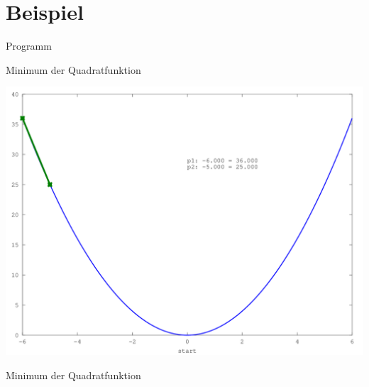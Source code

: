 \documentclass[\outputformat]{beamer}
\begin{document}


\section{Beispiel}
\begin{frame}{Programm}\tableofcontents[currentsection]\end{frame}

\begin{frame}{Minimum der Quadratfunktion}
	\begin{center}
		\includegraphics[height=0.75\paperheight]{../bilder/Quadrat/sinx_x001.png}
	\end{center}
\end{frame}

\begin{frame}{Minimum der Quadratfunktion}

\end{frame}
\end{document}
